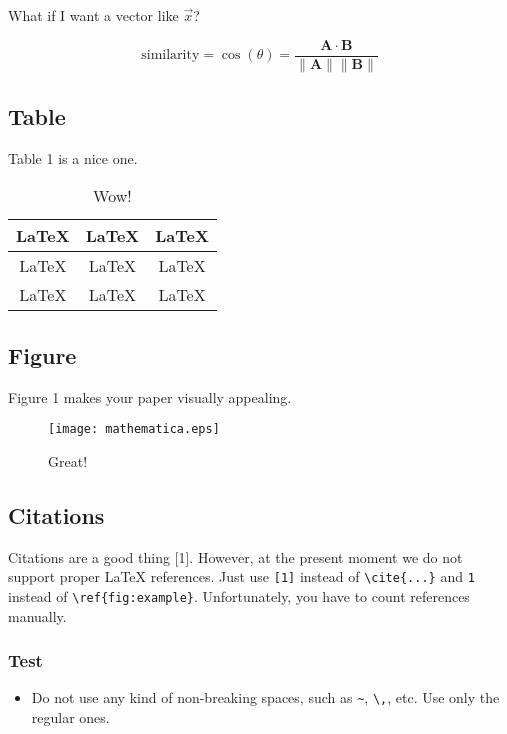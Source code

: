 \documentclass[a4paper]{article}
\begin{document}
What if I want a vector like $\vec{x}$?

\begin{equation}
  \text{similarity} = \cos(\theta) = \frac{\mathbf{A} \cdot \mathbf{B}}{\|\mathbf{A}\| \|\mathbf{B}\|}
\end{equation}

\subsection{Table}

Table 1 is a nice one.

\begin{table}[htbp]
\centering
\caption{Wow!}
\begin{tabular}{|c|c|c|}\hline
\LaTeX & \LaTeX & \LaTeX \\\hline
\LaTeX & \LaTeX & \LaTeX \\\hline
\LaTeX & \LaTeX & \LaTeX \\\hline
\end{tabular}
\end{table}

\subsection{Figure}

Figure 1 makes your paper visually appealing.

\begin{figure}[htbp]
\centering
\texttt{[image: mathematica.eps]}
\caption{Great!}
\end{figure}

\subsection{Citations}

Citations are a good thing [1]. However, at the present moment we do not support proper {\LaTeX} references. Just use \verb|[1]| instead of \verb|\cite{...}| and \verb|1| instead of \verb|\ref{fig:example}|. Unfortunately, you have to count references manually.

\subsubsection{Test}

\begin{itemize}
  \item Do not use any kind of non-breaking spaces, such as \verb|~|, \verb|\,|, etc. Use only the regular ones.
\end{itemize}
\end{document}
